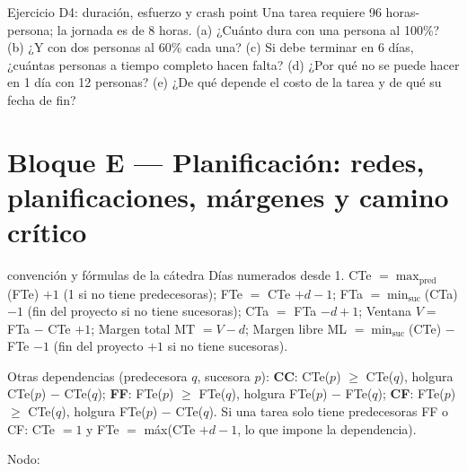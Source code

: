 \documentclass[11pt,a4paper]{article}
\newcommand{\tnode}[9][tarea]{\node[#1,
  label={[temp,anchor=south west,inner sep=1pt]north west:#6},
  label={[temp,anchor=south east,inner sep=1pt]north east:#7},
  label={[tard,anchor=north west,inner sep=1pt]south west:#8},
  label={[tard,anchor=north east,inner sep=1pt]south east:#9}] (#2) at (#3) {\textbf{#4}\hspace{5mm}#5};}
\begin{document}
\begin{enunciado}{Ejercicio D4: duración, esfuerzo y crash point}
Una tarea requiere 96 horas-persona; la jornada es de 8 horas. (a) ¿Cuánto dura con una persona al 100\%? (b) ¿Y
con dos personas al 60\% cada una? (c) Si debe terminar en 6 días, ¿cuántas personas a tiempo completo hacen
falta? (d) ¿Por qué no se puede hacer en 1 día con 12 personas? (e) ¿De qué depende el costo de la tarea y de
qué su fecha de fin?
\end{enunciado}

\section{Bloque E --- Planificación: redes, planificaciones, márgenes y camino crítico}
\begin{plantilla}{convención y fórmulas de la cátedra}
Días numerados desde 1. CTe $= \max_{\text{pred}}$(FTe) $+ 1$ (1 si no tiene predecesoras); FTe $=$ CTe $+ d - 1$;
FTa $= \min_{\text{suc}}$(CTa) $- 1$ (fin del proyecto si no tiene sucesoras); CTa $=$ FTa $- d + 1$; Ventana
$V =$ FTa $-$ CTe $+ 1$; Margen total MT $= V - d$; Margen libre ML $= \min_{\text{suc}}$(CTe) $-$ FTe $- 1$
(fin del proyecto $+ 1$ si no tiene sucesoras).

Otras dependencias (predecesora $q$, sucesora $p$): \textbf{CC}: CTe($p$) $\ge$ CTe($q$), holgura CTe($p$) $-$
CTe($q$); \textbf{FF}: FTe($p$) $\ge$ FTe($q$), holgura FTe($p$) $-$ FTe($q$); \textbf{CF}: FTe($p$) $\ge$
CTe($q$), holgura FTe($p$) $-$ CTe($q$). Si una tarea solo tiene predecesoras FF o CF: CTe $= 1$ y FTe $=$
máx(CTe $+ d - 1$, lo que impone la dependencia).

Nodo: \quad{}
\end{plantilla}
\end{document}
